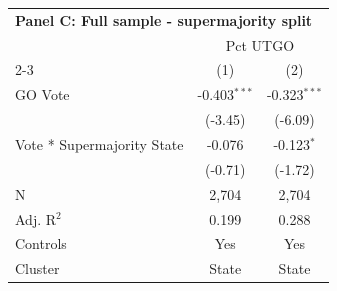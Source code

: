 \begingroup
\centering
\begin{tabular*}{\textwidth}{@{\extracolsep{\fill}}lcc}
\multicolumn{5}{l}{\textbf{Panel C: Full sample - supermajority split}}\\

\addlinespace
   \toprule
    & \multicolumn{2}{c}{Pct UTGO}\\
   \cmidrule(lr){2-3}
                              & (1)            & (2)\\  
   \midrule 
   GO Vote                    & -0.403$^{***}$ & -0.323$^{***}$\\   
                              & (-3.45)        & (-6.09)\\   
   Vote * Supermajority State & -0.076         & -0.123$^{*}$\\   
                              & (-0.71)       & (-1.72)\\   
   \hline
   N               & 2,704          & 2,704\\  
   Adj. R$^2$             & 0.199          & 0.288\\  
   Controls                   & Yes            & Yes\\
   Cluster              & State & State\\  
   \bottomrule
\end{tabular*}
\par\endgroup
